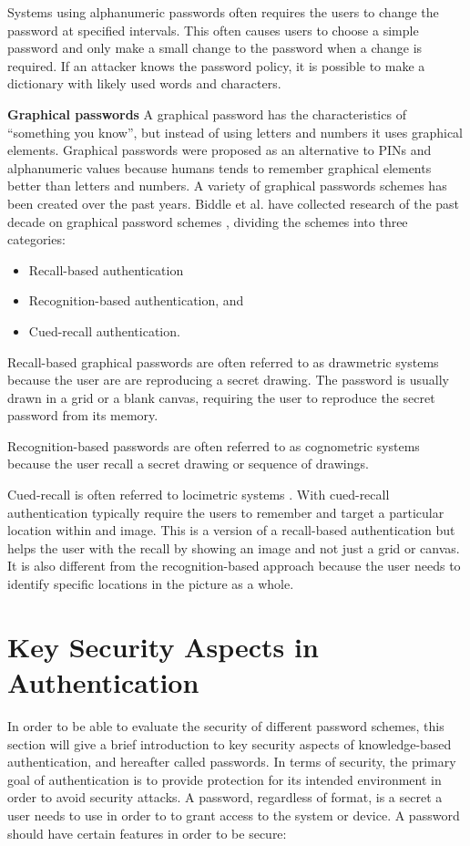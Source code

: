     Systems using alphanumeric passwords often requires the users to change the password at specified intervals. This often causes users to choose a simple password and only make a small change to the password when a change is required. If an attacker knows the password policy, it is possible to make a dictionary with likely used words and characters.

    {\bf Graphical passwords}
    A graphical password has the characteristics of ``something you know'', but instead of using letters and numbers it uses graphical elements. Graphical passwords were proposed as an alternative to PINs and alphanumeric values because humans tends to remember graphical elements better than letters and numbers. A variety of graphical passwords schemes has been created over the past years. Biddle et al. have collected research of the past decade on graphical password schemes \cite{Biddle}, dividing the schemes into three categories:

      \begin{itemize}
        \item Recall-based authentication
        \item Recognition-based authentication, and 
        \item Cued-recall authentication.
      \end{itemize}

    Recall-based graphical passwords are often referred to as drawmetric systems \cite{DeAngeli} because the user are are reproducing a secret drawing. The password is usually drawn in a grid or a blank canvas, requiring the user to reproduce the secret password from its memory.

    Recognition-based passwords are often referred to as cognometric systems \cite{DeAngeli} because the user recall a secret drawing or sequence of drawings.

    Cued-recall is often referred to locimetric systems \cite{DeAngeli}. With cued-recall authentication typically require the users to remember and target a particular location within and image. This is a version of a recall-based authentication but helps the user with the recall by showing an image and not just a grid or canvas. It is also different from the recognition-based approach because the user needs to identify specific locations in the picture as a whole. 
    
  \section{Key Security Aspects in Authentication} \label{sec:entropy}
  In order to be able to evaluate the security of different password schemes, this section will give a brief introduction to key security aspects of knowledge-based authentication, and hereafter called passwords. In terms of security, the primary goal of authentication is to provide protection for its intended environment in order to avoid security attacks. A password, regardless of format, is a secret a user needs to use in order to to grant access to the system or device. A password should have certain features in order to be secure:

